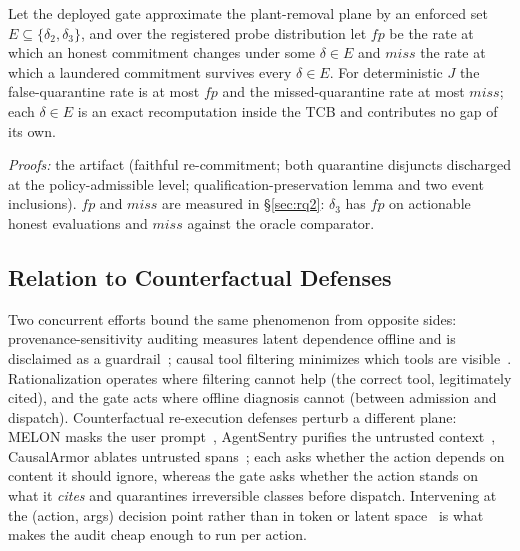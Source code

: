 \begin{proposition}
\label{prop:approxgap}
Let the deployed gate approximate the plant-removal plane by an
enforced set $E \subseteq \{\delta_2, \delta_3\}$, and over the
registered probe distribution let $\mathit{fp}$ be the rate at which an
honest commitment changes under some $\delta \in E$ and $\mathit{miss}$
the rate at which a laundered commitment survives every $\delta \in E$.
For deterministic $J$ the false-quarantine rate is at most $\mathit{fp}$
and the missed-quarantine rate at most $\mathit{miss}$; each
$\delta \in E$ is an exact recomputation inside the TCB and contributes
no gap of its own.
\end{proposition}
\noindent\emph{Proofs:} the artifact (faithful re-commitment; both
quarantine disjuncts discharged at the policy-admissible level;
qualification-preservation lemma and two event inclusions).
$\mathit{fp}$ and $\mathit{miss}$ are measured in \S\ref{sec:rq2}:
$\delta_3$ has $\mathit{fp}$ \RqTwoHonestDeltaThreeRate{} on actionable
honest evaluations and $\mathit{miss}$ \RqTwoDeltaThreeMissRate{} against
the oracle comparator.

\subsection{Relation to Counterfactual Defenses}
Two concurrent efforts bound the same phenomenon from opposite sides:
provenance-sensitivity auditing measures latent dependence offline and
is disclaimed as a guardrail~\cite{liao2026provenance}; causal tool
filtering minimizes which tools are visible~\cite{babu2026gistcmtf}.
Rationalization operates where filtering cannot help (the correct tool,
legitimately cited), and the gate acts where offline diagnosis cannot
(between admission and dispatch). Counterfactual re-execution defenses
perturb a different plane: MELON masks the user prompt~\cite{melon},
AgentSentry purifies the untrusted context~\cite{agentsentry},
CausalArmor ablates untrusted spans~\cite{causalarmor}; each asks
whether the action depends on content it should ignore, whereas the gate
asks whether the action stands on what it \emph{cites} and quarantines
irreversible classes before dispatch. Intervening at the (action, args)
decision point rather than in token or latent space~\cite{pona2025acf}
is what makes the audit cheap enough to run per action.


